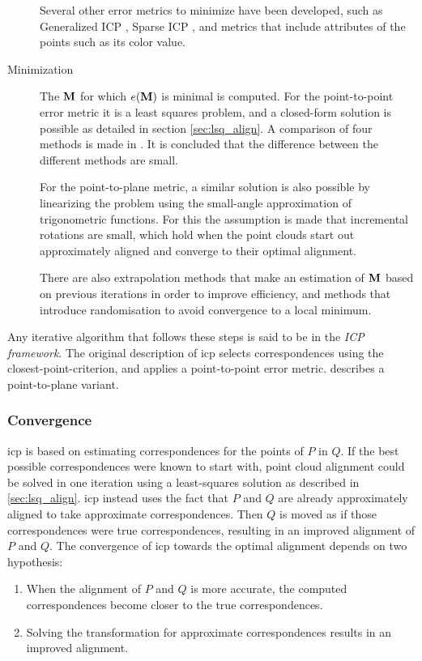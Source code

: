 \begin{description}
Several other error metrics to minimize have been developed, such as Generalized ICP \cite{Sega2009}, Sparse ICP \cite{Boua2013}, and metrics that include attributes of the points such as its color value.

\item[Minimization] The $\mathbf{M}$ for which $e(\mathbf{M})$ is minimal is computed. For the point-to-point error metric it is a least squares problem, and a closed-form solution is possible as detailed in section \ref{sec:lsq_align}. A comparison of four methods is made in \cite{Loru1995}. It is concluded that the difference between the different methods are small.

For the point-to-plane metric, a similar solution is also possible by linearizing the problem using the small-angle approximation of trigonometric functions. \cite{Chen1991} For this the assumption is made that incremental rotations are small, which hold when the point clouds start out approximately aligned and converge to their optimal alignment.

There are also extrapolation methods that make an estimation of $\mathbf{M}$ based on previous iterations in order to improve efficiency, and methods that introduce randomisation to avoid convergence to a local minimum. \cite{Rusi2001}
\end{description}

Any iterative algorithm that follows these steps is said to be in the \emph{ICP framework}. The original description \cite{Besl1992} of \gls{icp} selects correspondences using the closest-point-criterion, and applies a point-to-point error metric. \cite{Chen1991} describes a point-to-plane variant.


\subsubsection{Convergence}
\gls{icp} is based on estimating correspondences for the points of $P$ in $Q$. If the best possible correspondences were known to start with, point cloud alignment could be solved in one iteration using a least-squares solution as described in \ref{sec:lsq_align}. \gls{icp} instead uses the fact that $P$ and $Q$ are already approximately aligned to take approximate correspondences. Then $Q$ is moved as if those correspondences were true correspondences, resulting in an improved alignment of $P$ and $Q$.  The convergence of \gls{icp} towards the optimal alignment depends on two hypothesis:

\begin{enumerate}
\item When the alignment of $P$ and $Q$ is more accurate, the computed correspondences become closer to the true correspondences.
\item Solving the transformation for approximate correspondences results in an improved alignment.
\end{enumerate}


